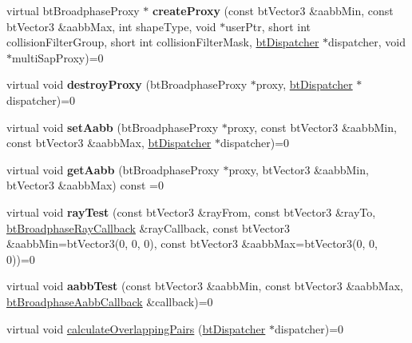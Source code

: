 \begin{DoxyCompactItemize}
virtual bt\+Broadphase\+Proxy $\ast$ {\bfseries create\+Proxy} (const bt\+Vector3 \&aabb\+Min, const bt\+Vector3 \&aabb\+Max, int shape\+Type, void $\ast$user\+Ptr, short int collision\+Filter\+Group, short int collision\+Filter\+Mask, \hyperlink{classbtDispatcher}{bt\+Dispatcher} $\ast$dispatcher, void $\ast$multi\+Sap\+Proxy)=0
\item 
\mbox{\label{classbtBroadphaseInterface_a70f3806d52b97251af59b498947d730d}} 
virtual void {\bfseries destroy\+Proxy} (bt\+Broadphase\+Proxy $\ast$proxy, \hyperlink{classbtDispatcher}{bt\+Dispatcher} $\ast$dispatcher)=0
\item 
\mbox{\label{classbtBroadphaseInterface_a5dafdb7e104b1634202d1b21668a5aa7}} 
virtual void {\bfseries set\+Aabb} (bt\+Broadphase\+Proxy $\ast$proxy, const bt\+Vector3 \&aabb\+Min, const bt\+Vector3 \&aabb\+Max, \hyperlink{classbtDispatcher}{bt\+Dispatcher} $\ast$dispatcher)=0
\item 
\mbox{\label{classbtBroadphaseInterface_a8fc16d360eea987b878ab7fd2efcabe3}} 
virtual void {\bfseries get\+Aabb} (bt\+Broadphase\+Proxy $\ast$proxy, bt\+Vector3 \&aabb\+Min, bt\+Vector3 \&aabb\+Max) const =0
\item 
\mbox{\label{classbtBroadphaseInterface_a516bf7f981dc4540c32c67820de64e0c}} 
virtual void {\bfseries ray\+Test} (const bt\+Vector3 \&ray\+From, const bt\+Vector3 \&ray\+To, \hyperlink{structbtBroadphaseRayCallback}{bt\+Broadphase\+Ray\+Callback} \&ray\+Callback, const bt\+Vector3 \&aabb\+Min=bt\+Vector3(0, 0, 0), const bt\+Vector3 \&aabb\+Max=bt\+Vector3(0, 0, 0))=0
\item 
\mbox{\label{classbtBroadphaseInterface_a19d8d870968460c4a191937a3bb8ecc4}} 
virtual void {\bfseries aabb\+Test} (const bt\+Vector3 \&aabb\+Min, const bt\+Vector3 \&aabb\+Max, \hyperlink{structbtBroadphaseAabbCallback}{bt\+Broadphase\+Aabb\+Callback} \&callback)=0
\item 
\mbox{\label{classbtBroadphaseInterface_a27e29cb6fd31e5fe626e7ba973e67ddb}} 
virtual void \hyperlink{classbtBroadphaseInterface_a27e29cb6fd31e5fe626e7ba973e67ddb}{calculate\+Overlapping\+Pairs} (\hyperlink{classbtDispatcher}{bt\+Dispatcher} $\ast$dispatcher)=0

\end{DoxyCompactItemize}
